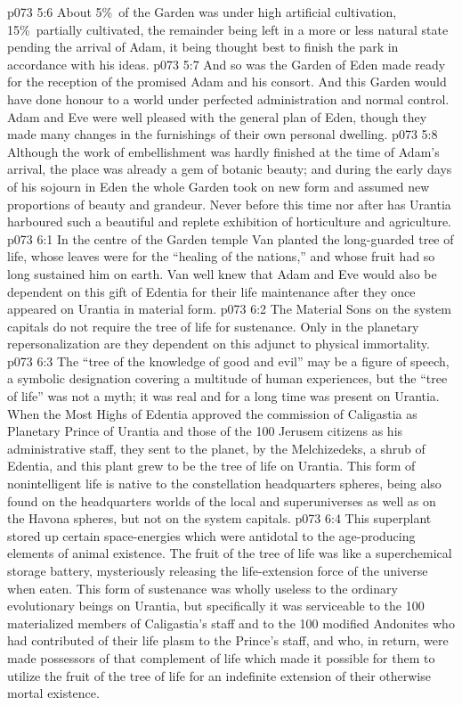\vs p073 5:6 About 5\%\ of the Garden was under high artificial cultivation, 15\%\ partially cultivated, the remainder being left in a more or less natural state pending the arrival of Adam, it being thought best to finish the park in accordance with his ideas.
\vs p073 5:7 And so was the Garden of Eden made ready for the reception of the promised Adam and his consort. And this Garden would have done honour to a world under perfected administration and normal control. Adam and Eve were well pleased with the general plan of Eden, though they made many changes in the furnishings of their own personal dwelling.
\vs p073 5:8 Although the work of embellishment was hardly finished at the time of Adam’s arrival, the place was already a gem of botanic beauty; and during the early days of his sojourn in Eden the whole Garden took on new form and assumed new proportions of beauty and grandeur. Never before this time nor after has Urantia harboured such a beautiful and replete exhibition of horticulture and agriculture.
\vs p073 6:1 In the centre of the Garden temple Van planted the long\hyp{}guarded tree of life, whose leaves were for the “healing of the nations,” and whose fruit had so long sustained him on earth. Van well knew that Adam and Eve would also be dependent on this gift of Edentia for their life maintenance after they once appeared on Urantia in material form.
\vs p073 6:2 The Material Sons on the system capitals do not require the tree of life for sustenance. Only in the planetary repersonalization are they dependent on this adjunct to physical immortality.
\vs p073 6:3 \pc The “tree of the knowledge of good and evil” may be a figure of speech, a symbolic designation covering a multitude of human experiences, but the “tree of life” was not a myth; it was real and for a long time was present on Urantia. When the Most Highs of Edentia approved the commission of Caligastia as Planetary Prince of Urantia and those of the 100 Jerusem citizens as his administrative staff, they sent to the planet, by the Melchizedeks, a shrub of Edentia, and this plant grew to be the tree of life on Urantia. This form of nonintelligent life is native to the constellation headquarters spheres, being also found on the headquarters worlds of the local and superuniverses as well as on the Havona spheres, but not on the system capitals.
\vs p073 6:4 This superplant stored up certain space\hyp{}energies which were antidotal to the age\hyp{}producing elements of animal existence. The fruit of the tree of life was like a superchemical storage battery, mysteriously releasing the life\hyp{}extension force of the universe when eaten. This form of sustenance was wholly useless to the ordinary evolutionary beings on Urantia, but specifically it was serviceable to the 100 materialized members of Caligastia’s staff and to the 100 modified Andonites who had contributed of their life plasm to the Prince’s staff, and who, in return, were made possessors of that complement of life which made it possible for them to utilize the fruit of the tree of life for an indefinite extension of their otherwise mortal existence.
